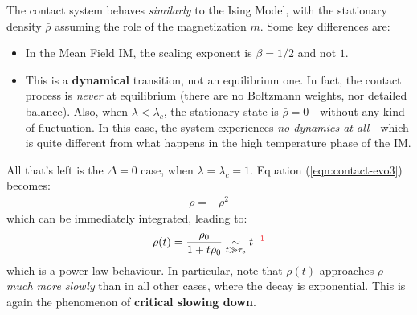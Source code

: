 \documentclass[../../main.tex]{subfiles}
\begin{document}
\medskip

The contact system behaves \textit{similarly} to the Ising Model, with the stationary density $\bar{\rho}$ assuming the role of the magnetization $m$. Some key differences are:
\begin{itemize}
    \item In the Mean Field IM, the scaling exponent is $\beta = 1/2$ and not $1$.
    \item This is a \textbf{dynamical} transition, not an equilibrium one. In fact, the contact process is \textit{never} at equilibrium (there are no Boltzmann weights, nor detailed balance). Also, when $\lambda < \lambda_c$, the stationary state is $\bar{\rho} = 0$ - without any kind of fluctuation. In this case, the system experiences \textit{no dynamics at all} - which is quite different from what happens in the high temperature phase of the IM.   
\end{itemize}
 
All that's left is the $\Delta = 0$ case, when $\lambda = \lambda_c = 1$. Equation (\ref{eqn:contact-evo3}) becomes:
\begin{align*}
    \dot{\rho} = - \rho^2
\end{align*}
which can be immediately integrated, leading to:
\begin{align*}
    \rho(t) = \frac{\rho_0}{1 + t \rho_0} \underset{t \gg \tau_c}{\sim}  t^{\textcolor{Red}{-1}} 
\end{align*}
which is a power-law behaviour. In particular, note that $\rho(t)$ approaches $\bar{\rho}$ \textit{much more slowly} than in all other cases, where the decay is exponential. This is again the phenomenon of \textbf{critical slowing down}. 
\end{document}

